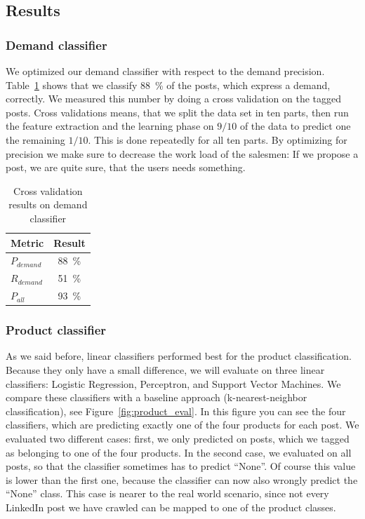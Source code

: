 \subsection{Results}
\label{sub:results}

\subsubsection{Demand classifier}
\label{ssub:demand_classifier}

We optimized our demand classifier with respect to the demand precision.
Table~\ref{table:demand_evaluation} shows that we classify 88~\% of the posts, which express a demand, correctly.
We measured this number by doing a cross validation on the tagged posts.
Cross validations means, that we split the data set in ten parts, then run the feature extraction and the learning phase on $9 / 10$ of the data to predict one the remaining $1 / 10$.
This is done repeatedly for all ten parts.
By optimizing for precision we make sure to decrease the work load of the salesmen: If we propose a post, we are quite sure, that the users needs something.

\begin{table}[h]
	\centering
	\begin{tabular}{lc}
		\hline
		\textbf{Metric} & \textbf{Result}  \\
		\hline
		\hline
		$P_{demand}$ & 88~\% \\
		\hline
		$R_{demand}$ & 51~\%  \\
		\hline
		$P_{all}$ & 93~\%  \\
		\hline
	\end{tabular}
	\caption{Cross validation results on demand classifier}
	\label{table:demand_evaluation}
\end{table}

\subsubsection{Product classifier}
\label{ssub:product_classifier}

As we said before, linear classifiers performed best for the product classification.
Because they only have a small difference, we will evaluate on three linear classifiers: Logistic Regression, Perceptron, and Support Vector Machines.
We compare these classifiers with a baseline approach (k-nearest-neighbor classification), see Figure~\ref{fig:product_eval}.
In this figure you can see the four classifiers, which are predicting exactly one of the four products for each post.
We evaluated two different cases:
first, we only predicted on posts, which we tagged as belonging to one of the four products.
In the second case, we evaluated on all posts, so that the classifier sometimes has to predict ``None''.
Of course this value is lower than the first one, because the classifier can now also wrongly predict the ``None'' class.
This case is nearer to the real world scenario, since not every LinkedIn post we have crawled can be mapped to one of the product classes.

